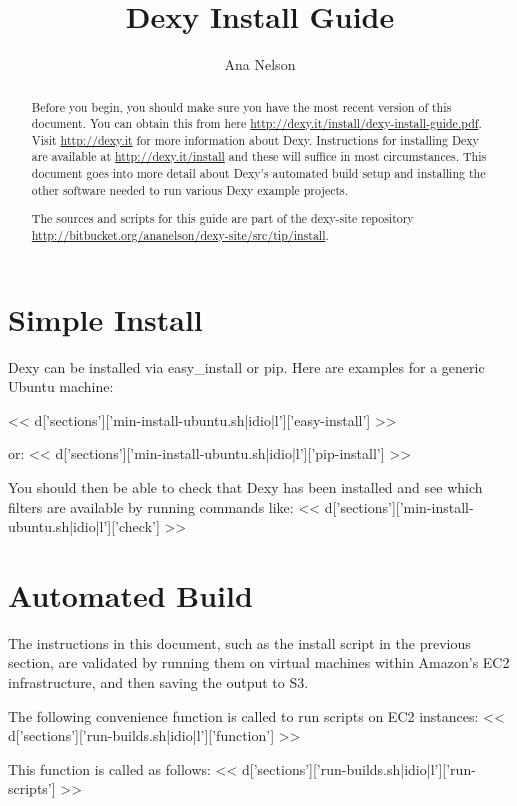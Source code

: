 \documentclass{tufte-handout}
\title{Dexy Install Guide}
\author{Ana Nelson}
\begin{document}
\maketitle

\begin{abstract}
Before you begin, you should make sure you have the most recent version of this document. You can obtain this from here \url{http://dexy.it/install/dexy-install-guide.pdf}. Visit \url{http://dexy.it} for more information about Dexy. Instructions for installing Dexy are available at \url{http://dexy.it/install} and these will suffice in most circumstances. This document goes into more detail about Dexy's automated build setup and installing the other software needed to run various Dexy example projects.

The sources and scripts for this guide are part of the dexy-site repository \url{http://bitbucket.org/ananelson/dexy-site/src/tip/install}.

\end{abstract}

\section{Simple Install}

Dexy can be installed via easy\_install or pip. Here are examples for a generic Ubuntu machine:

<< d['sections']['min-install-ubuntu.sh|idio|l']['easy-install'] >>

\noindent or:
<< d['sections']['min-install-ubuntu.sh|idio|l']['pip-install'] >>

\noindent You should then be able to check that Dexy has been installed and see which filters are available by running commands like:
<< d['sections']['min-install-ubuntu.sh|idio|l']['check'] >>

\section{Automated Build}

The instructions in this document, such as the install script in the previous section, are validated by running them on virtual machines within Amazon's EC2 infrastructure, and then saving the output to S3.

\noindent The following convenience function is called to run scripts on EC2 instances:
<< d['sections']['run-builds.sh|idio|l']['function'] >>

\noindent This function is called as follows:
<< d['sections']['run-builds.sh|idio|l']['run-scripts'] >>
\end{document}
